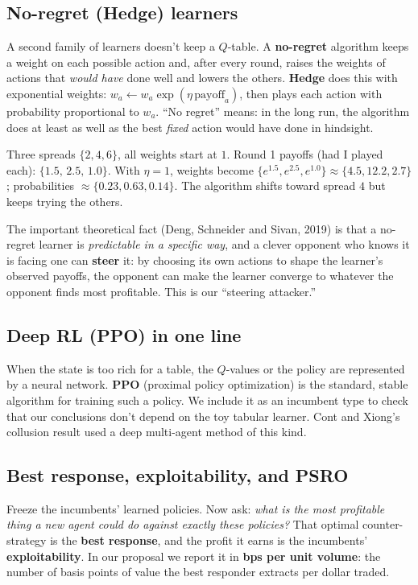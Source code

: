 \documentclass[11pt]{article}
\begin{document}
\subsection{No-regret (Hedge) learners}
A second family of learners doesn't keep a $Q$-table. A \textbf{no-regret} algorithm keeps a weight on each possible action and, after every round, raises the weights of actions that \emph{would have} done well and lowers the others. \textbf{Hedge} does this with exponential weights: $w_a\leftarrow w_a\exp(\eta\,\text{payoff}_a)$, then plays each action with probability proportional to $w_a$. ``No regret'' means: in the long run, the algorithm does at least as well as the best \emph{fixed} action would have done in hindsight.

\begin{example}
Three spreads $\{2,4,6\}$, all weights start at $1$. Round 1 payoffs (had I played each): $\{1.5,\,2.5,\,1.0\}$. With $\eta=1$, weights become $\{e^{1.5},e^{2.5},e^{1.0}\}\approx\{4.5,12.2,2.7\}$; probabilities $\approx\{0.23,0.63,0.14\}$. The algorithm shifts toward spread $4$ but keeps trying the others.
\end{example}

The important theoretical fact (Deng, Schneider and Sivan, 2019) is that a no-regret learner is \emph{predictable in a specific way}, and a clever opponent who knows it is facing one can \textbf{steer} it: by choosing its own actions to shape the learner's observed payoffs, the opponent can make the learner converge to whatever the opponent finds most profitable. This is our ``steering attacker.''

\subsection{Deep RL (PPO) in one line}
When the state is too rich for a table, the $Q$-values or the policy are represented by a neural network. \textbf{PPO} (proximal policy optimization) is the standard, stable algorithm for training such a policy. We include it as an incumbent type to check that our conclusions don't depend on the toy tabular learner. Cont and Xiong's collusion result used a deep multi-agent method of this kind.

\subsection{Best response, exploitability, and PSRO}\label{sec:exploit}
Freeze the incumbents' learned policies. Now ask: \emph{what is the most profitable thing a new agent could do against exactly these policies?} That optimal counter-strategy is the \textbf{best response}, and the profit it earns is the incumbents' \textbf{exploitability}. In our proposal we report it in \textbf{bps per unit volume}: the number of basis points of value the best responder extracts per dollar traded.
\end{document}
